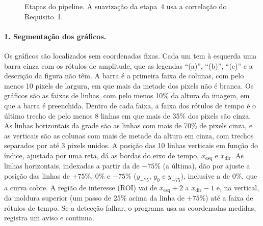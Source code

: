 \begin{figure}[H]
\centering
{}
\caption{Etapas do pipeline. A suavização da etapa~4 usa a correlação do Requisito~1.}
\label{fig:fluxo}
\end{figure}

\paragraph{1. Segmentação dos gráficos.}
Os gráficos são localizados sem coordenadas fixas. Cada um tem à esquerda uma barra cinza com os rótulos de amplitude, que as legendas ``(a)'', ``(b)'', ``(c)'' e a descrição da figura não têm. A barra é a primeira faixa de colunas, com pelo menos 10 pixels de largura, em que mais da metade dos pixels não é branca. Os gráficos são as faixas de linhas, com pelo menos 10\% da altura da imagem, em que a barra é preenchida. Dentro de cada faixa, a faixa dos rótulos de tempo é o último trecho de pelo menos 8 linhas em que mais de 35\% dos pixels são cinza. As linhas horizontais da grade são as linhas com mais de 70\% de pixels cinza, e as verticais são as colunas com mais de metade da altura em cinza, com trechos separados por até 3 pixels unidos. A posição das 10 linhas verticais em função do índice, ajustada por uma reta, dá as bordas do eixo de tempo, $x_{\text{esq}}$ e $x_{\text{dir}}$. As linhas horizontais, indexadas a partir da de $-75\%$ (a última), dão por ajuste a posição das linhas de $+75\%$, $0\%$ e $-75\%$ ($y_{+75}$, $y_0$ e $y_{-75}$), inclusive a de 0\%, que a curva cobre. A região de interesse (ROI) vai de $x_{\text{esq}}+2$ a $x_{\text{dir}}-1$ e, na vertical, da moldura superior (um passo de 25\% acima da linha de $+75\%$) até a faixa de rótulos de tempo. Se a detecção falhar, o programa usa as coordenadas medidas, registra um aviso e continua.

